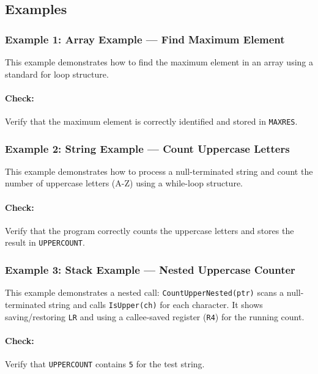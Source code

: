 \subsection{Examples}

\subsubsection{Example 1: Array Example — Find Maximum Element}
This example demonstrates how to find the maximum element in an array using a standard for loop structure.

\paragraph{Check:} Verify that the maximum element is correctly identified and stored in \texttt{MAXRES}.
\newpage

\subsubsection{Example 2: String Example — Count Uppercase Letters}
This example demonstrates how to process a null-terminated string and count the number of uppercase letters (A-Z) using a while-loop structure.

\paragraph{Check:} Verify that the program correctly counts the uppercase letters and stores the result in \texttt{UPPERCOUNT}.

\newpage
\subsubsection{Example 3: Stack Example — Nested Uppercase Counter}
This example demonstrates a nested call: \texttt{CountUpperNested(ptr)} scans a null-terminated string and calls \texttt{IsUpper(ch)} for each character. It shows saving/restoring \texttt{LR} and using a callee-saved register (\texttt{R4}) for the running count.

\paragraph{Check:} Verify that \texttt{UPPERCOUNT} contains \texttt{5} for the test string.

